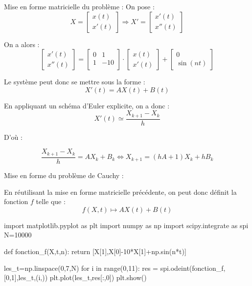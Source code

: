 \documentclass[10pt,fleqn]{article} %
\begin{document}
\begin{corrige}
Mise en forme matricielle du problème : 
On pose : 
$$
X = \left[
\begin{array}{c}
x(t) \\
x'(t)
\end{array}
\right]
\Rightarrow
X' = \left[
\begin{array}{c}
x'(t) \\
x''(t)
\end{array}
\right]
$$

On a alors : $$
\left[
\begin{array}{c}
x'(t) \\
x''(t)
\end{array}
\right]
=
 \left[
\begin{array}{cc}
0 & 1 \\
 1 &- 10\\
\end{array}
\right]
\cdot
 \left[
\begin{array}{c}
x(t) \\
x'(t)
\end{array}
\right]
+
\left[
\begin{array}{c}
0 \\
\sin (nt)
\end{array}
\right]
$$

Le système peut donc se mettre sous la forme : 
$$
X'(t) = AX(t)+ B(t)
$$

En appliquant un schéma d'Euler explicite, on a donc :
$$
X'(t) \simeq \dfrac{X_{k+1}-X_{k}}{h}
$$ 

D'où :

$$
\dfrac{X_{k+1}-X_{k}}{h} = AX_k + B_k 
\Leftrightarrow 
X_{k+1} = (hA +1) X_k + hB_k
$$
\end{corrige}



\begin{corrige}
Mise en forme du problème de Cauchy : 

En réutilisant la mise en forme matricielle précédente, on peut donc définit la fonction $f$ telle que : 
$$
f(X,t) \mapsto  AX(t) + B(t)
$$


\begin{python}
import matplotlib.pyplot as plt
import numpy as np
import scipy.integrate as spi
N=10000

def fonction_f(X,t,n):
   return [X[1],X[0]-10*X[1]+np.sin(n*t)]

les_t=np.linspace(0,7,N)
for i in range(0,11):
    res = spi.odeint(fonction_f,[0,1],les_t,(i,))
    plt.plot(les_t,res[:,0])
plt.show()
\end{python}
\end{corrige}
\end{document}
